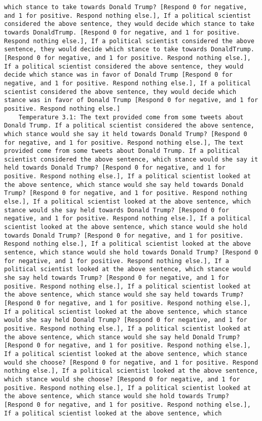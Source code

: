 \begin{lstlisting}[label=lst:poor_performing_prompts]
which stance to take towards Donald Trump? [Respond 0 for negative, and 1 for positive. Respond nothing else.], If a political scientist considered the above sentence, they would decide which stance to take towards DonaldTrump. [Respond 0 for negative, and 1 for positive. Respond nothing else.], If a political scientist considered the above sentence, they would decide which stance to take towards DonaldTrump. [Respond 0 for negative, and 1 for positive. Respond nothing else.], If a political scientist considered the above sentence, they would decide which stance was in favor of Donald Trump [Respond 0 for negative, and 1 for positive. Respond nothing else.], If a political scientist considered the above sentence, they would decide which stance was in favor of Donald Trump [Respond 0 for negative, and 1 for positive. Respond nothing else.]
	Temperature 3.1: The text provided come from some tweets about Donald Trump. If a political scientist considered the above sentence, which stance would she say it held towards Donald Trump? [Respond 0 for negative, and 1 for positive. Respond nothing else.], The text provided come from some tweets about Donald Trump. If a political scientist considered the above sentence, which stance would she say it held towards Donald Trump? [Respond 0 for negative, and 1 for positive. Respond nothing else.], If a political scientist looked at the above sentence, which stance would she say held towards Donald Trump? [Respond 0 for negative, and 1 for positive. Respond nothing else.], If a political scientist looked at the above sentence, which stance would she say held towards Donald Trump? [Respond 0 for negative, and 1 for positive. Respond nothing else.], If a political scientist looked at the above sentence, which stance would she hold towards Donald Trump? [Respond 0 for negative, and 1 for positive. Respond nothing else.], If a political scientist looked at the above sentence, which stance would she hold towards Donald Trump? [Respond 0 for negative, and 1 for positive. Respond nothing else.], If a political scientist looked at the above sentence, which stance would she say held towards Trump? [Respond 0 for negative, and 1 for positive. Respond nothing else.], If a political scientist looked at the above sentence, which stance would she say held towards Trump? [Respond 0 for negative, and 1 for positive. Respond nothing else.], If a political scientist looked at the above sentence, which stance would she say held Donald Trump? [Respond 0 for negative, and 1 for positive. Respond nothing else.], If a political scientist looked at the above sentence, which stance would she say held Donald Trump? [Respond 0 for negative, and 1 for positive. Respond nothing else.], If a political scientist looked at the above sentence, which stance would she choose? [Respond 0 for negative, and 1 for positive. Respond nothing else.], If a political scientist looked at the above sentence, which stance would she choose? [Respond 0 for negative, and 1 for positive. Respond nothing else.], If a political scientist looked at the above sentence, which stance would she hold towards Trump? [Respond 0 for negative, and 1 for positive. Respond nothing else.], If a political scientist looked at the above sentence, which 
\end{lstlisting}
